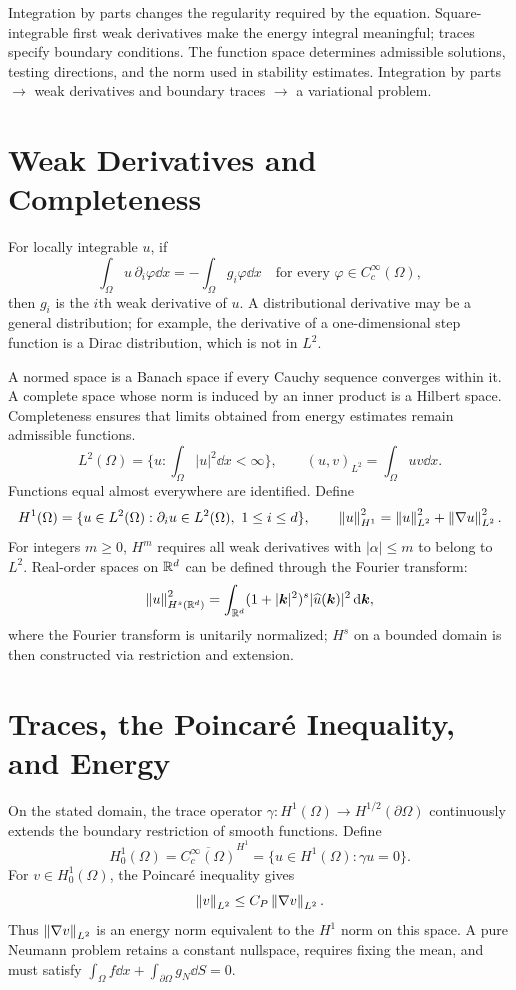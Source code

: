 {Integration by parts changes the regularity required by the equation. Square-integrable first weak derivatives make the energy integral meaningful; traces specify boundary conditions. The function space determines admissible solutions, testing directions, and the norm used in stability estimates.}
{Integration by parts $\longrightarrow$ weak derivatives and boundary traces $\longrightarrow$ a variational problem.}

\section{Weak Derivatives and Completeness}
For locally integrable $u$, if
\[
\int_\Omega u\,\partial_i\varphi\dd x=-\int_\Omega g_i\varphi\dd x
\quad\text{for every }\varphi\in C_c^\infty(\Omega),
\]
then $g_i$ is the $i$th weak derivative of $u$. A distributional derivative may be a general distribution;
for example, the derivative of a one-dimensional step function is a Dirac distribution, which is not in $L^2$.

A normed space is a Banach space if every Cauchy sequence converges within it.
A complete space whose norm is induced by an inner product is a Hilbert space. Completeness ensures that limits obtained from energy estimates remain admissible functions.
\[
L^2(\Omega)=\{u:\int_\Omega|u|^2\dd x<\infty\},\qquad
(u,v)_{L^2}=\int_\Omega uv\dd x.
\]
Functions equal almost everywhere are identified. Define
\[
H^1(\Omega)=\{u\in L^2(\Omega):\partial_i u\in L^2(\Omega),\ 1\le i\le d\},
\qquad
\left\lVert u\right\rVert_{H^1}^2=\left\lVert u\right\rVert_{L^2}^2+\left\lVert\nabla u\right\rVert_{L^2}^2.
\]
For integers $m\ge0$, $H^m$ requires all weak derivatives with $|\alpha|\le m$ to belong to $L^2$.
Real-order spaces on $\mathbb R^d$ can be defined through the Fourier transform:
\[
\left\lVert u\right\rVert_{H^s(\mathbb R^d)}^2
=\int_{\mathbb R^d}(1+|\bm k|^2)^s|\widehat u(\bm k)|^2\,\mathrm d\bm k,
\]
where the Fourier transform is unitarily normalized; $H^s$ on a bounded domain is then constructed via restriction and extension.

\section{Traces, the Poincar\'e Inequality, and Energy}
On the stated domain, the trace operator $\gamma:H^1(\Omega)\to H^{1/2}(\partial\Omega)$
continuously extends the boundary restriction of smooth functions. Define
\[
H_0^1(\Omega)=\overline{C_c^\infty(\Omega)}^{H^1}
=\{u\in H^1(\Omega):\gamma u=0\}.
\]
For $v\in H_0^1(\Omega)$, the Poincar\'e inequality gives
\[
\left\lVert v\right\rVert_{L^2}\le C_P\left\lVert\nabla v\right\rVert_{L^2}.
\]
Thus $\left\lVert\nabla v\right\rVert_{L^2}$ is an energy norm equivalent to the $H^1$ norm on this space.
A pure Neumann problem retains a constant nullspace, requires fixing the mean, and must satisfy
$\int_\Omega f\dd x+\int_{\partial\Omega}g_N\dd S=0$.

